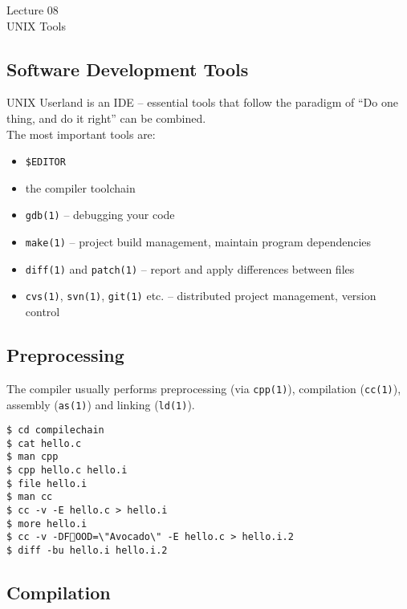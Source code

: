 \documentclass[xga]{xdvislides}
\begin{document}
\newpage
\vspace*{\fill}
\begin{center}
  \Hugesize
	Lecture 08
	\hspace*{5mm}\blueline\\ [1em]
	UNIX Tools
  \Normalsize
\end{center}
\vspace*{\fill}

\subsection{Software Development Tools}
UNIX Userland is an IDE -- essential tools that follow the paradigm of ``Do
one thing, and do it right'' can be combined. \\

The most important tools are:
\begin{itemize}
	\item \verb+$EDITOR+
	\item the compiler toolchain
	\item {\tt gdb(1)} -- debugging your code
	\item {\tt make(1)} -- project build management, maintain program
		dependencies
	\item {\tt diff(1)} and {\tt patch(1)} -- report and apply differences
		between files
	\item {\tt cvs(1)}, {\tt svn(1)}, {\tt git(1)} etc. -- distributed project management,
		 version control
\end{itemize}

\subsection{Preprocessing}

The compiler usually performs preprocessing (via {\tt cpp(1)}), compilation
({\tt cc(1)}), assembly ({\tt as(1)}) and linking ({\tt ld(1)}).

\begin{verbatim}
$ cd compilechain
$ cat hello.c
$ man cpp
$ cpp hello.c hello.i
$ file hello.i
$ man cc
$ cc -v -E hello.c > hello.i
$ more hello.i
$ cc -v -DFOOD=\"Avocado\" -E hello.c > hello.i.2
$ diff -bu hello.i hello.i.2
\end{verbatim}

\subsection{Compilation}
\end{document}

